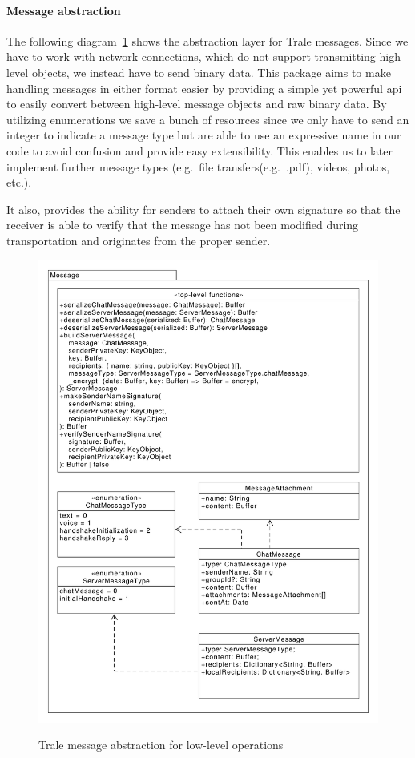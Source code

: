\paragraph{Message abstraction}
The following diagram~\ref{fig:figure35} shows the abstraction layer for Trale messages.
Since we have to work with network connections, which do not support transmitting high-level objects, we instead have
to send binary data.
This package aims to make handling messages in either format easier by providing a simple yet powerful \ac{api} to
easily convert between high-level message objects and raw binary data.
By utilizing enumerations we save a bunch of resources since we only have to send an integer to indicate a message type
but are able to use an expressive name in our code to avoid confusion and provide easy extensibility.
This enables us to later implement further message types (e.g.\ file transfers(e.g.\ .pdf), videos, photos, etc.).

It also, provides the ability for senders to attach their own signature so that the receiver is able to verify that the
message has not been modified during transportation and originates from the proper sender.

\begin{figure}[H]
    \centering
    \caption{Trale message abstraction for low-level operations}
    \includegraphics[width=1.0\textwidth]{./graphics/classDiagramTransportLibrary-Message}
    \label{fig:figure35}
\end{figure}

